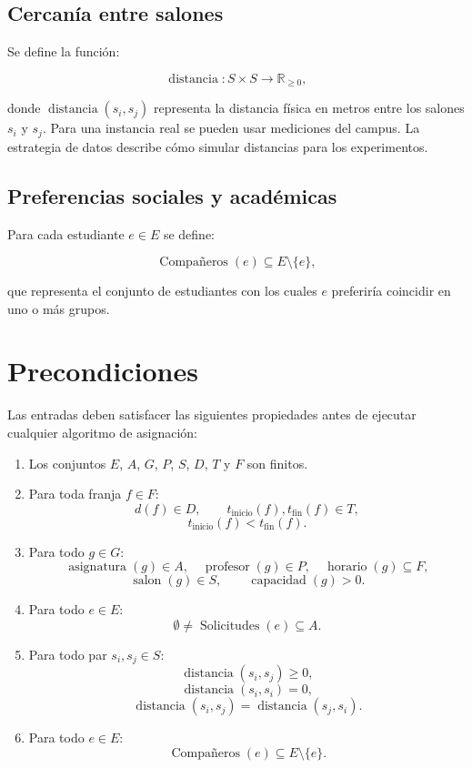 \documentclass[11pt]{article}
\numberwithin{equation}{section}
\numberwithin{figure}{section}
\numberwithin{table}{section}
\theoremstyle{definition}
\begin{document}
\subsection{Cercanía entre salones}

Se define la función:

\[
\operatorname{distancia}:S\times S\rightarrow\mathbb{R}_{\geq 0},
\]

donde $\operatorname{distancia}(s_i,s_j)$ representa la distancia física en
metros entre los salones $s_i$ y $s_j$. Para una instancia real se pueden
usar mediciones del campus. La estrategia de datos describe cómo simular
distancias para los experimentos.

\subsection{Preferencias sociales y académicas}

Para cada estudiante $e\in E$ se define:

\[
\operatorname{Compañeros}(e)\subseteq E\setminus\{e\},
\]

que representa el conjunto de estudiantes con los cuales $e$ preferiría
coincidir en uno o más grupos.

\section{Precondiciones}

Las entradas deben satisfacer las siguientes propiedades antes de ejecutar
cualquier algoritmo de asignación:

\begin{enumerate}
  \item Los conjuntos $E$, $A$, $G$, $P$, $S$, $D$, $T$ y $F$ son finitos.
  \item Para toda franja $f\in F$:
        \[
        d(f)\in D,\qquad
        t_{\mathrm{inicio}}(f),t_{\mathrm{fin}}(f)\in T,
        \]
        \[
        t_{\mathrm{inicio}}(f)<t_{\mathrm{fin}}(f).
        \]
  \item Para todo $g\in G$:
        \[
        \operatorname{asignatura}(g)\in A,\quad
        \operatorname{profesor}(g)\in P,\quad
        \operatorname{horario}(g)\subseteq F,
        \]
        \[
        \operatorname{salon}(g)\in S,\qquad
        \operatorname{capacidad}(g)>0.
        \]
  \item Para todo $e\in E$:
        \[
        \emptyset\neq\operatorname{Solicitudes}(e)\subseteq A.
        \]
  \item Para todo par $s_i,s_j\in S$:
        \[
        \operatorname{distancia}(s_i,s_j)\geq 0,
        \]
        \[
        \operatorname{distancia}(s_i,s_i)=0,
        \]
        \[
        \operatorname{distancia}(s_i,s_j)
        =\operatorname{distancia}(s_j,s_i).
        \]
  \item Para todo $e\in E$:
        \[
        \operatorname{Compañeros}(e)\subseteq E\setminus\{e\}.
        \]
\end{enumerate}
\end{document}
